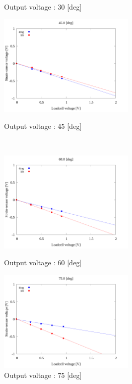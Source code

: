\begin{figure}[htbp]
\begin{minipage}[b]{0.45\linewidth}
        \caption{Output voltage : 30 [deg]}
      \end{minipage}
      \begin{minipage}[b]{0.45\linewidth}
        \centering
        \includegraphics[width=65mm]{../../02_workspace/result/2-1/plot/04/04_linear_450.png}
        \caption{Output voltage : 45 [deg]}
      \end{minipage} \\
      \begin{minipage}[b]{0.45\linewidth}
        \centering
        \includegraphics[width=65mm]{../../02_workspace/result/2-1/plot/04/04_linear_600.png}
        \caption{Output voltage : 60 [deg]}
      \end{minipage}
      \begin{minipage}[b]{0.45\linewidth}
        \centering
        \includegraphics[width=65mm]{../../02_workspace/result/2-1/plot/04/04_linear_750.png}
        \caption{Output voltage : 75 [deg]}
      \end{minipage}
    \end{figure}

